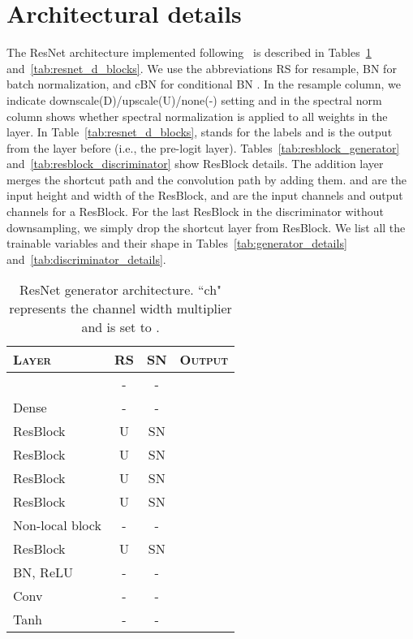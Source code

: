 \documentclass{article}
\begin{document}
\section{Architectural details}\label{sec:arch_details}
The ResNet architecture implemented following~\citet{brock2018large} is described in Tables~\ref{tab:resnet_g_blocks} and~\ref{tab:resnet_d_blocks}.
We use the abbreviations RS for resample, BN for batch normalization, and cBN for conditional BN \cite{dumoulin2017learned, de2017modulating}. In the resample column, we indicate downscale(D)/upscale(U)/none(-) setting and in the spectral norm column shows whether spectral normalization is applied to all weights in the layer.
In Table~\ref{tab:resnet_d_blocks},  stands for the labels and  is the output from the layer before (i.e., the pre-logit layer).
Tables~\ref{tab:resblock_generator} and~\ref{tab:resblock_discriminator} show ResBlock details.
The addition layer merges the shortcut path and the convolution path by adding them.
 and  are the input height and width of the ResBlock,
 and  are the input channels and output channels for a ResBlock.
For the last ResBlock in the discriminator without downsampling,
we simply drop the shortcut layer from ResBlock. We list all the trainable variables and their shape in Tables~\ref{tab:generator_details} and~\ref{tab:discriminator_details}.
\begin{table}[h]
\centering
\caption{\label{tab:resnet_g_blocks}ResNet generator architecture. ``ch" represents the channel width multiplier and is set to .\vspace{0.2cm}}
\begin{tabular}{lccc}
\toprule
\textsc{Layer}               & \textsc{RS} & \textsc{SN} & \textsc{Output}               \\ \toprule
 & -           & -           &                          \\ \midrule
Dense                        & -           & -           &     \\
ResBlock                     & U           & SN          &     \\
ResBlock                     & U           & SN          &    \\
ResBlock                     & U           & SN          &    \\
ResBlock                     & U           & SN          &    \\
Non-local block              & -           & -           &    \\
ResBlock                     & U           & SN          &  \\
BN, ReLU                     & -           & -           &          \\
Conv              & -           & -           &          \\
Tanh                         & -           & -           &          \\ \bottomrule
\end{tabular}
\end{table}
\end{document}
